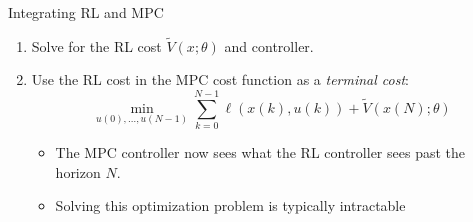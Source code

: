 \documentclass[xcolor=dvipsnames,aspectratio=169]{beamer}
\begin{document}
\begin{frame}{Integrating RL and MPC}
	\begin{enumerate}
		\item Solve for the RL cost $\tilde{V}(x;\theta)$ and controller.
		\item Use the RL cost in the MPC cost function as a \textit{terminal 
		cost}: 
		\begin{equation*}
			\min_{u(0),\dots,u(N-1)} \sum_{k=0}^{N-1} \ell(x(k),u(k)) + 
			\tilde{V}(x(N);\theta)
		\end{equation*}
		\begin{itemize}
			\item The MPC controller now sees what the RL controller sees past 
			the horizon $N$. 
			\item Solving this optimization problem is typically intractable
		\end{itemize} 
	\end{enumerate}
\end{frame}
\end{document}
